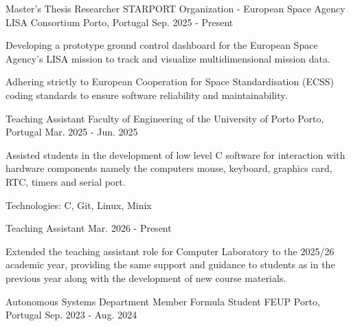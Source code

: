 
\begin{cventries}
  \cventry
    {Master's Thesis Researcher}
    {STARPORT Organization - European Space Agency LISA Consortium}
    {Porto, Portugal}
    {Sep. 2025 - Present}
    {
      \begin{cvitems}
        \item {Developing a prototype ground control dashboard for the European Space Agency's LISA mission to track and visualize multidimensional mission data.}
        \item {Adhering strictly to European Cooperation for Space Standardisation (ECSS) coding standards to ensure software reliability and maintainability.}
      \end{cvitems}
    }
  \cventrytwopositions
    {Teaching Assistant}
    {Faculty of Engineering of the University of Porto} %
    {Porto, Portugal} %
    {Mar. 2025 - Jun. 2025} %
    {
      \begin{cvitems} %
        \item {Assisted students in the development of low level C software for interaction with hardware components namely the computers mouse, keyboard, graphics card, RTC, timers and serial port.}
        \item {Technologies: C, Git, Linux, Minix}
      \end{cvitems}
    }
    {Teaching Assistant} %
    {Mar. 2026 - Present} %
    {
      \begin{cvitems} %
        \item {Extended the teaching assistant role for Computer Laboratory to the 2025/26 academic year, providing the same support and guidance to students as in the previous year along with the development of new course materials.}
      \end{cvitems}
    }
  \cventrytwopositions
    {Autonomous Systems Department Member} 
    {Formula Student FEUP}
    {Porto, Portugal}
    {Sep. 2023 - Aug. 2024} 
    {
      \begin{cvitems}

\end{cvitems}}
\end{cventries}
